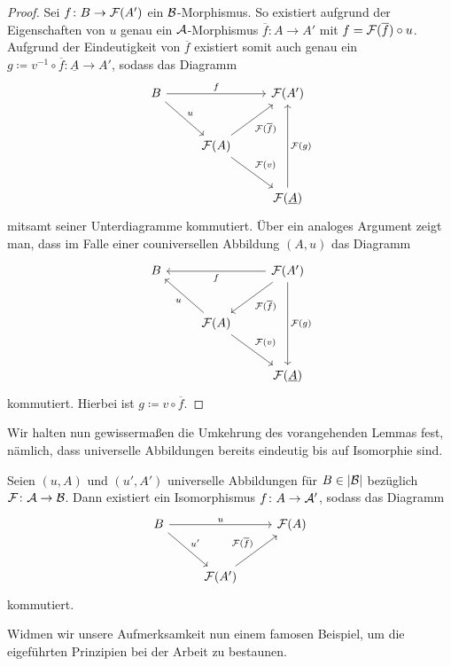 \begin{proof}
  Sei $f \colon B \to \mathcal{F}(A')$ ein $\mathcal{B}$-Morphismus. 
  So existiert aufgrund der Eigenschaften von $u$ genau ein $\mathcal{A}$-Morphismus $\overline f \colon A \to A'$ mit $f = \mathcal{F}(\overline f) \circ u$.
  Aufgrund der Eindeutigkeit von $\overline f$ existiert somit auch genau ein $g \coloneqq v^{-1} \circ \overline f \colon \underline A \to A'$, sodass das Diagramm   
  $$
  \begin{tikzcd}[row sep=2.5em]
    B \arrow[rd,"u"] \arrow[rr, "f"] &&\F(A') \\
    &\F(A) \arrow[ru, "\F(\overline{f})"'] \arrow[rd,"\F(v)"] \\
    &&\F(\underline A) \arrow[uu,"\F(g)"']
  \end{tikzcd}
  $$
  mitsamt seiner Unterdiagramme kommutiert.
  Über ein analoges Argument zeigt man, dass im Falle einer couniversellen Abbildung $(A,u)$ das Diagramm
  $$
  \begin{tikzcd}[row sep=2.5em]
    B  & & \F(A') \arrow[ll, "f"]\arrow[ld, "\F(\overline{f})"] \arrow[dd, "\F(g)"] \\
    & \F(A) \arrow[lu,"u"] \arrow[rd, "\F(v)"]  & \\
    & & \F(\underline A) 
  \end{tikzcd}
  $$
  kommutiert. Hierbei ist $g \coloneqq v \circ \overline f$.
\end{proof}

Wir halten nun gewissermaßen die Umkehrung des vorangehenden Lemmas fest, nämlich, dass universelle Abbildungen bereits eindeutig bis auf Isomorphie sind.

\begin{prop}
  Seien $(u,A)$ und $(u',A')$ universelle Abbildungen für $B \in |\mathcal{B}|$ bezüglich $\mathcal{F} \colon \mathcal{A} \to \mathcal{B}$.
  Dann existiert ein Isomorphismus $f \colon A \to \mathcal{A}'$, sodass das Diagramm
  $$
  \begin{tikzcd}[row sep=2.5em]
    B \arrow[rd,"u'"] \arrow[rr, "u"] &&\F(A) \\
    &\F(A') \arrow[ru, "\F(\overline{f})"]
  \end{tikzcd}
  $$
  kommutiert.
\end{prop}

Widmen wir unsere Aufmerksamkeit nun einem famosen Beispiel, um die eigeführten Prinzipien bei der Arbeit zu bestaunen.

